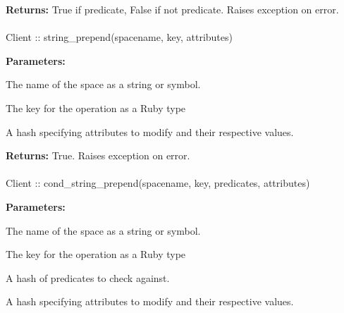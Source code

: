 \noindent\textbf{Returns:}
True if predicate, False if not predicate.  Raises exception on error.

\paragraph{}
\label{api:ruby:string_prepend}
\begin{ccode}
Client :: string_prepend(spacename, key, attributes)
\end{ccode}
\funcdesc 

\noindent\textbf{Parameters:}
\begin{description}[labelindent=\widthof{{\code{attributes}}},leftmargin=*,noitemsep,nolistsep,align=right]
\item[\code{spacename}] The name of the space as a string or symbol.
\item[\code{key}] The key for the operation as a Ruby type
\item[\code{attributes}] A hash specifying attributes to modify and their respective values.
\end{description}

\noindent\textbf{Returns:}
True.  Raises exception on error.

\paragraph{}
\label{api:ruby:cond_string_prepend}
\begin{ccode}
Client :: cond_string_prepend(spacename, key, predicates, attributes)
\end{ccode}
\funcdesc 

\noindent\textbf{Parameters:}
\begin{description}[labelindent=\widthof{{\code{predicates}}},leftmargin=*,noitemsep,nolistsep,align=right]
\item[\code{spacename}] The name of the space as a string or symbol.
\item[\code{key}] The key for the operation as a Ruby type
\item[\code{predicates}] A hash of predicates to check against.
\item[\code{attributes}] A hash specifying attributes to modify and their respective values.
\end{description}

